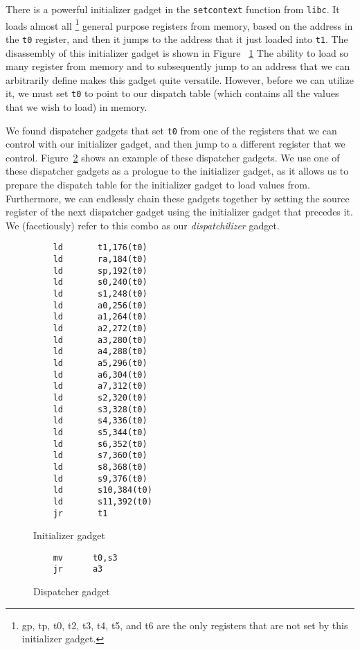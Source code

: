 There is a powerful initializer gadget in the \verb|setcontext| function from
\verb|libc|. It loads almost all%
\footnote{gp, tp, t0, t2, t3, t4, t5, and t6 are the only registers that are not set by this
initializer gadget.}
general purpose registers from memory, based on the address in the \verb|t0|
register, and then it jumps to the address that it just loaded into \verb|t1|.
The disassembly of this initializer gadget is shown in Figure~%
\ref{initializer gadget} The ability to load so many register from memory and
to subsequently jump to an address that we can arbitrarily define makes this
gadget quite versatile. However, before we can utilize it, we must set \verb|t0|
to point to our dispatch table (which contains all the values that we wish to
load) in memory.

We found dispatcher gadgets that set \verb|t0| from one of the registers that we
can control with our initializer gadget, and then jump to a different register
that we control. Figure~\ref{dispatcher gadget} shows an example of these
dispatcher gadgets. We use one of these dispatcher gadgets as a prologue to the
initializer gadget, as it allows us to prepare the dispatch table for the
initializer gadget to load values from. Furthermore, we can endlessly chain
these gadgets together by setting the source register of the next dispatcher
gadget using the initializer gadget that precedes it. We (facetiously) refer to
this combo as our \textit{dispatchilizer} gadget.

\begin{figure}
    \caption{Initializer gadget}
    \label{initializer gadget}
    \begin{lstlisting}
    ld       t1,176(t0)
    ld       ra,184(t0)
    ld       sp,192(t0)
    ld	     s0,240(t0)
    ld	     s1,248(t0)
    ld	     a0,256(t0)
    ld	     a1,264(t0)
    ld	     a2,272(t0)
    ld	     a3,280(t0)
    ld	     a4,288(t0)
    ld	     a5,296(t0)
    ld	     a6,304(t0)
    ld	     a7,312(t0)
    ld	     s2,320(t0)
    ld	     s3,328(t0)
    ld	     s4,336(t0)
    ld	     s5,344(t0)
    ld	     s6,352(t0)
    ld	     s7,360(t0)
    ld	     s8,368(t0)
    ld	     s9,376(t0)
    ld	     s10,384(t0)
    ld	     s11,392(t0)
    jr	     t1
    \end{lstlisting}
\end{figure}

\begin{figure}
    \caption{Dispatcher gadget}
    \label{dispatcher gadget}
    \begin{lstlisting}
    mv      t0,s3
    jr      a3
    \end{lstlisting}
\end{figure}

